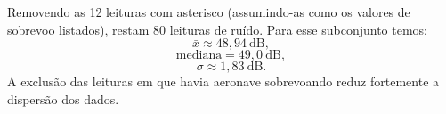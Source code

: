 Removendo as 12 leituras com asterisco (assumindo-as como os valores de sobrevoo listados), restam 80 leituras de ruído. Para esse subconjunto temos:
\[
\bar{x} \approx 48{,}94\ \text{dB},
\]
\[
\text{mediana} = 49{,}0\ \text{dB},
\]
\[
\sigma \approx 1{,}83\ \text{dB}.
\]
A exclusão das leituras em que havia aeronave sobrevoando reduz fortemente a dispersão dos dados.  